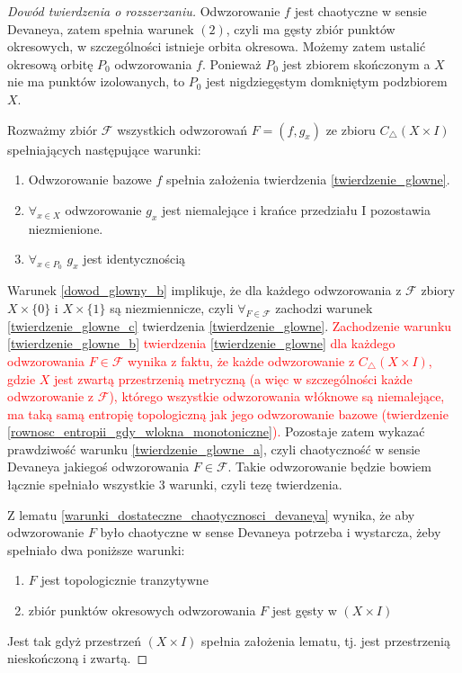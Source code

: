 \documentclass[licencjacka]{pwr_wmat_praca_dyplomowa}
\theoremstyle{plain}
\numberwithin{theorem}{chapter}
\theoremstyle{definition}
\numberwithin{theorem}{chapter}
\begin{document}
\begin{proof}[Dowód twierdzenia o rozszerzaniu]
Odwzorowanie $f$ jest chaotyczne w sensie Devaneya, zatem spełnia warunek $(2)$, czyli ma gęsty zbiór punktów okresowych, w szczególności istnieje orbita okresowa.
Możemy zatem ustalić okresową orbitę $P_0$ odwzorowania $f$. Ponieważ $P_0$ jest zbiorem skończonym a $X$ nie ma punktów izolowanych, to $P_0$ jest nigdziegęstym domkniętym podzbiorem $X$.

Rozważmy zbiór $\mathcal{F}$ wszystkich odwzorowań $F = (f, g_x)$ ze zbioru $C_\triangle(X \times I)$ spełniających następujące warunki:
\begin{enumerate}
\item\label{dowod_glowny_a} Odwzorowanie bazowe $f$ spełnia założenia twierdzenia \ref{twierdzenie_glowne}.
\item\label{dowod_glowny_b} $\forall_{x \in X}$ odwzorowanie $g_x$ jest niemalejące i krańce przedziału I pozostawia niezmienione.
\item\label{dowod_glowny_c} $\forall_{x \in P_0}$ $g_x$ jest identycznością 
\end{enumerate}

Warunek \ref{dowod_glowny_b} implikuje, że dla każdego odwzorowania z $\mathcal{F}$ zbiory $X \times \{0\}$ i $X \times \{1\}$ są niezmiennicze, czyli $\forall_{F \in \mathcal{F}}$ zachodzi warunek \ref{twierdzenie_glowne_c}  twierdzenia \ref{twierdzenie_glowne}.
\textcolor{red}{Zachodzenie warunku \ref{twierdzenie_glowne_b} twierdzenia \ref{twierdzenie_glowne} dla każdego odwzorowania $F \in \mathcal{F}$ wynika z faktu, że każde odwzorowanie z $C_\triangle(X \times I)$, gdzie $X$ jest zwartą przestrzenią metryczną (a więc w szczególności każde odwzorowanie z $\mathcal{F}$), którego wszystkie odwzorowania włóknowe są niemalejące, ma taką samą entropię topologiczną jak jego odwzorowanie bazowe (twierdzenie \ref{rownosc_entropii_gdy_wlokna_monotoniczne}).}
Pozostaje zatem wykazać prawdziwość warunku \ref{twierdzenie_glowne_a}, czyli chaotyczność w sensie Devaneya jakiegoś odwzorowania $F \in \mathcal{F}$. Takie odwzorowanie będzie bowiem łącznie spełniało wszystkie 3 warunki, czyli tezę twierdzenia.

Z lematu \ref{warunki_dostateczne_chaotycznosci_devaneya} wynika, że aby odwzorowanie $F$ było chaotyczne w sense Devaneya potrzeba i wystarcza, żeby spełniało dwa poniższe warunki:
\begin{enumerate}
\item \label{devaney_pierwsza_wlasnosc} $F$ jest topologicznie tranzytywne
\item \label{devaney_druga_wlasnosc} zbiór punktów okresowych odwzorowania $F$ jest gęsty w $(X \times I)$
\end{enumerate}
Jest tak gdyż przestrzeń $(X \times I)$ spełnia założenia lematu, tj. jest przestrzenią nieskończoną i zwartą.


\end{proof}
\end{document}
